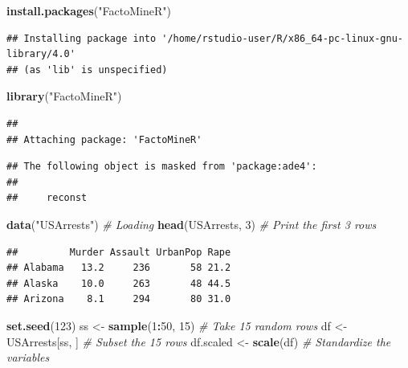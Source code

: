 \documentclass[
]{article}
\newenvironment{Shaded}{\begin{snugshade}}{\end{snugshade}}
\newcommand{\CommentTok}[1]{\textcolor[rgb]{0.56,0.35,0.01}{\textit{#1}}}
\newcommand{\DecValTok}[1]{\textcolor[rgb]{0.00,0.00,0.81}{#1}}
\newcommand{\KeywordTok}[1]{\textcolor[rgb]{0.13,0.29,0.53}{\textbf{#1}}}
\newcommand{\NormalTok}[1]{#1}
\newcommand{\OperatorTok}[1]{\textcolor[rgb]{0.81,0.36,0.00}{\textbf{#1}}}
\newcommand{\StringTok}[1]{\textcolor[rgb]{0.31,0.60,0.02}{#1}}
\begin{document}
\begin{Shaded}
\begin{Highlighting}[]
\KeywordTok{install.packages}\NormalTok{(}\StringTok{"FactoMineR"}\NormalTok{)}
\end{Highlighting}
\end{Shaded}

\begin{verbatim}
## Installing package into '/home/rstudio-user/R/x86_64-pc-linux-gnu-library/4.0'
## (as 'lib' is unspecified)
\end{verbatim}

\begin{Shaded}
\begin{Highlighting}[]
\KeywordTok{library}\NormalTok{(}\StringTok{"FactoMineR"}\NormalTok{)}
\end{Highlighting}
\end{Shaded}

\begin{verbatim}
## 
## Attaching package: 'FactoMineR'
\end{verbatim}

\begin{verbatim}
## The following object is masked from 'package:ade4':
## 
##     reconst
\end{verbatim}

\begin{Shaded}
\begin{Highlighting}[]
\KeywordTok{data}\NormalTok{(}\StringTok{"USArrests"}\NormalTok{) }\CommentTok{# Loading}
\KeywordTok{head}\NormalTok{(USArrests, }\DecValTok{3}\NormalTok{) }\CommentTok{# Print the first 3 rows}
\end{Highlighting}
\end{Shaded}

\begin{verbatim}
##         Murder Assault UrbanPop Rape
## Alabama   13.2     236       58 21.2
## Alaska    10.0     263       48 44.5
## Arizona    8.1     294       80 31.0
\end{verbatim}

\begin{Shaded}
\begin{Highlighting}[]
\KeywordTok{set.seed}\NormalTok{(}\DecValTok{123}\NormalTok{)}
\NormalTok{ss <-}\StringTok{ }\KeywordTok{sample}\NormalTok{(}\DecValTok{1}\OperatorTok{:}\DecValTok{50}\NormalTok{, }\DecValTok{15}\NormalTok{) }\CommentTok{# Take 15 random rows}
\NormalTok{df <-}\StringTok{ }\NormalTok{USArrests[ss, ] }\CommentTok{# Subset the 15 rows}
\NormalTok{df.scaled <-}\StringTok{ }\KeywordTok{scale}\NormalTok{(df) }\CommentTok{# Standardize the variables}
\end{Highlighting}
\end{Shaded}
\end{document}
